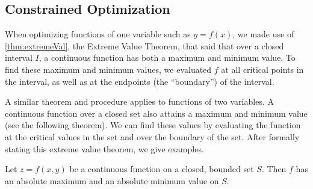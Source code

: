 \subsection*{Constrained Optimization}

When optimizing functions of one variable such as $y=f(x)$, we made use of \autoref{thm:extremeVal}, the Extreme Value Theorem, that said that over a closed interval $I$, a continuous function has both a maximum and minimum value. To find these maximum and minimum values, we evaluated $f$ at all critical points in the interval, as well as at the endpoints (the ``boundary'') of the interval.

A similar theorem and procedure applies to functions of two variables. A continuous function over a closed set also attains a maximum and minimum value (see the following theorem). We can find these values by evaluating the function at the critical values in the set and over the boundary of the set. After formally stating this extreme value theorem, we give examples.

{Let $z=f(x,y)$ be a continuous function on a closed, bounded set $S$. Then $f$ has an absolute maximum and an absolute minimum value on $S$.
}

